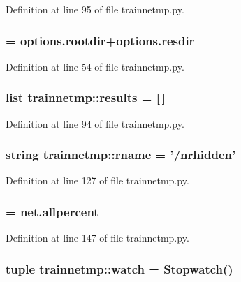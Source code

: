 Definition at line 95 of file trainnetmp.py.

\hypertarget{namespacetrainnetmp_ab566ffaeaa6913a2b2b347cff1a608a4}{
\subsubsection[{resdir}]{ = options.rootdir+options.resdir}}
\label{namespacetrainnetmp_ab566ffaeaa6913a2b2b347cff1a608a4}


Definition at line 54 of file trainnetmp.py.

\hypertarget{namespacetrainnetmp_acf60722e6b94f8b6613aff40c374d19f}{
\subsubsection[{results}]{\setlength{\rightskip}{0pt plus 5cm}list {\bf trainnetmp::results} = \mbox{[}$\,$\mbox{]}}}
\label{namespacetrainnetmp_acf60722e6b94f8b6613aff40c374d19f}


Definition at line 94 of file trainnetmp.py.

\hypertarget{namespacetrainnetmp_a01a4fd22ee2cc1aba08b4566d95bb2a4}{
\subsubsection[{rname}]{\setlength{\rightskip}{0pt plus 5cm}string {\bf trainnetmp::rname} = '/nrhidden'}}
\label{namespacetrainnetmp_a01a4fd22ee2cc1aba08b4566d95bb2a4}


Definition at line 127 of file trainnetmp.py.

\hypertarget{namespacetrainnetmp_a72596b0af8ecedd242cba70b6819b03d}{
\subsubsection[{val}]{ = net.allpercent}}
\label{namespacetrainnetmp_a72596b0af8ecedd242cba70b6819b03d}


Definition at line 147 of file trainnetmp.py.

\hypertarget{namespacetrainnetmp_ad0c5cbbe64c5ef22afe865ff2f038740}{
\subsubsection[{watch}]{\setlength{\rightskip}{0pt plus 5cm}tuple {\bf trainnetmp::watch} = Stopwatch()}}
\label{namespacetrainnetmp_ad0c5cbbe64c5ef22afe865ff2f038740}


